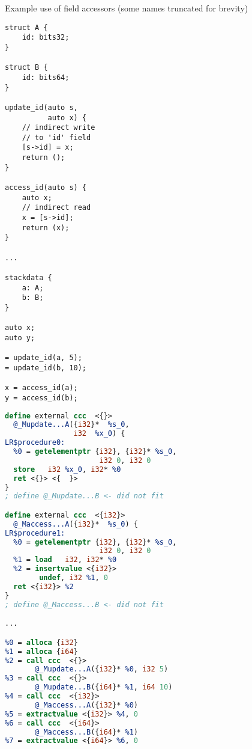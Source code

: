\begin{listing}
    \caption{Example use of field accessors (some names truncated for brevity)}
    \label{lst:fieldAccessors}
    \begin{center}
    \begin{minipage}{0.45\linewidth}
    \begin{lstlisting}[basicstyle=\footnotesize\ttfamily]
struct A {
    id: bits32;
}

struct B {
    id: bits64;
}

update_id(auto s,
          auto x) {
    // indirect write
    // to 'id' field
    [s->id] = x;
    return ();
}

access_id(auto s) {
    auto x;
    // indirect read
    x = [s->id];
    return (x);
}

...

stackdata {
    a: A;
    b: B;
}

auto x;
auto y;

= update_id(a, 5);
= update_id(b, 10);

x = access_id(a);
y = access_id(b);
    \end{lstlisting}
    \end{minipage}%
    \begin{minipage}{0.55\linewidth}
    \begin{lstlisting}[language=LLVM,basicstyle=\scriptsize\ttfamily]
define external ccc  <{}>
  @_Mupdate...A({i32}*  %s_0,
                i32  %x_0) {
LR$procedure0:
  %0 = getelementptr {i32}, {i32}* %s_0,
                      i32 0, i32 0
  store   i32 %x_0, i32* %0
  ret <{}> <{  }>
}
; define @_Mupdate...B <- did not fit

define external ccc  <{i32}>
  @_Maccess...A({i32}*  %s_0) {
LR$procedure1:
  %0 = getelementptr {i32}, {i32}* %s_0,
                      i32 0, i32 0
  %1 = load   i32, i32* %0
  %2 = insertvalue <{i32}>
        undef, i32 %1, 0
  ret <{i32}> %2
}
; define @_Maccess...B <- did not fit

...

%0 = alloca {i32}
%1 = alloca {i64}
%2 = call ccc  <{}>
       @_Mupdate...A({i32}* %0, i32 5)
%3 = call ccc  <{}>
       @_Mupdate...B({i64}* %1, i64 10)
%4 = call ccc  <{i32}>
       @_Maccess...A({i32}* %0)
%5 = extractvalue <{i32}> %4, 0
%6 = call ccc  <{i64}>
       @_Maccess...B({i64}* %1)
%7 = extractvalue <{i64}> %6, 0

    \end{lstlisting}
    \end{minipage}
    \end{center}
\end{listing}

